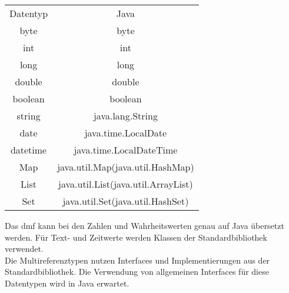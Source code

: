 \documentclass[./einleitung.tex]{subfiles}
\begin{document}
    \begin{center}
        \begin{tabular}{| c || c |}
            \hline
            Datentyp & Java                    \\
            \hhline{|=||=|}
            byte     & byte                    \\
            \hline
            int      & int                     \\
            \hline
            long     & long                    \\
            \hline
            double   & double                  \\
            \hline
            boolean  & boolean                 \\
            \hline
            string   & java.lang.String        \\
            \hline
            date     & java.time.LocalDate     \\
            \hline
            datetime & java.time.LocalDateTime \\
            \hline
            Map & java.util.Map(java.util.HashMap)\\
            \hline
            List & java.util.List(java.util.ArrayList)\\
            \hline
            Set & java.util.Set(java.util.HashSet)\\
            \hline
        \end{tabular}
    \end{center}
    Das \acrshort{dmf} kann bei den Zahlen und Wahrheitswerten genau auf Java übersetzt werden.
    Für Text- und Zeitwerte werden Klassen der Standardbibliothek verwendet.\\
    Die Multireferenztypen nutzen Interfaces und Implementierungen aus der Standardbibliothek.
    Die Verwendung von allgemeinen Interfaces für diese Datentypen wird in Java erwartet.
\end{document}
